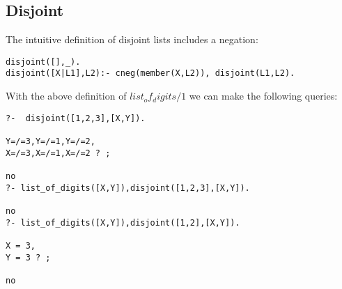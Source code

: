 \documentclass{tlp}
\begin{document}
\subsection*{Disjoint}

The intuitive definition of disjoint lists includes a negation:
\begin{small}
\begin{verbatim}
disjoint([],_).
disjoint([X|L1],L2):- cneg(member(X,L2)), disjoint(L1,L2).
\end{verbatim}
\end{small}

With the above definition of $list_of_digits/1$ we can make the following
queries: 
\begin{small}
\begin{verbatim}
?-  disjoint([1,2,3],[X,Y]).

Y=/=3,Y=/=1,Y=/=2,
X=/=3,X=/=1,X=/=2 ? ;

no
?- list_of_digits([X,Y]),disjoint([1,2,3],[X,Y]).

no
?- list_of_digits([X,Y]),disjoint([1,2],[X,Y]).

X = 3,
Y = 3 ? ;

no
\end{verbatim}
\end{small}




\end{document}
